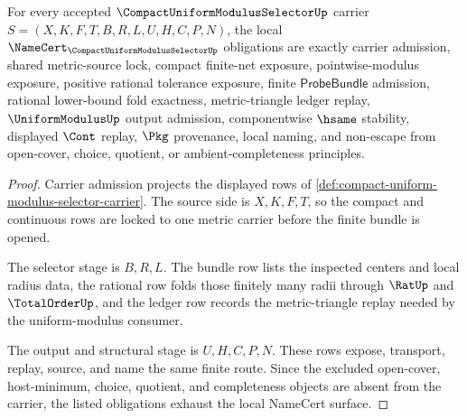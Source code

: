 \begin{theorem}
\label{thm:compact-uniform-modulus-selector-namecert-obligations}
For every accepted $\CompactUniformModulusSelectorUp$ carrier $S=(X,K,F,T,B,R,L,U,H,C,P,N)$, the local $\NameCert_{\CompactUniformModulusSelectorUp}$ obligations are exactly carrier admission, shared metric-source lock, compact finite-net exposure, pointwise-modulus exposure, positive rational tolerance exposure, finite $\mathsf{ProbeBundle}$ admission, rational lower-bound fold exactness, metric-triangle ledger replay, $\UniformModulusUp$ output admission, componentwise $\hsame$ stability, displayed $\Cont$ replay, $\Pkg$ provenance, local naming, and non-escape from open-cover, choice, quotient, or ambient-completeness principles.
\end{theorem}
\begin{proof}
Carrier admission projects the displayed rows of \autoref{def:compact-uniform-modulus-selector-carrier}. The source side is $X,K,F,T$, so the compact and continuous rows are locked to one metric carrier before the finite bundle is opened.

The selector stage is $B,R,L$. The bundle row lists the inspected centers and local radius data, the rational row folds those finitely many radii through $\RatUp$ and $\TotalOrderUp$, and the ledger row records the metric-triangle replay needed by the uniform-modulus consumer.

The output and structural stage is $U,H,C,P,N$. These rows expose, transport, replay, source, and name the same finite route. Since the excluded open-cover, host-minimum, choice, quotient, and completeness objects are absent from the carrier, the listed obligations exhaust the local NameCert surface.
\end{proof}


